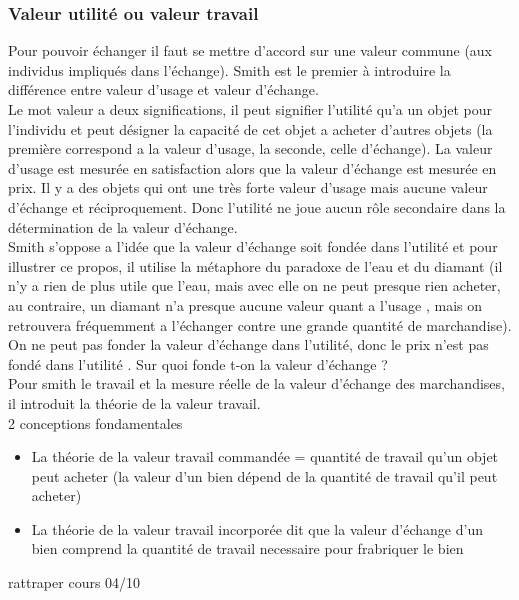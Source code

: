 \documentclass{article}
\begin{document}
\subsubsection{Valeur utilité ou valeur travail}
Pour pouvoir échanger il faut se mettre d'accord sur une valeur commune (aux individus impliqués dans l'échange). Smith est le premier à introduire la différence entre valeur d'usage et valeur d'échange. \\
Le mot valeur a deux significations, il peut signifier l'utilité qu'a un objet pour l'individu et peut désigner la capacité de cet objet a acheter d'autres objets (la première correspond a la valeur d'usage, la seconde, celle d'échange). La valeur d'usage est mesurée en satisfaction alors que la valeur d'échange est mesurée en prix. Il y a des objets qui ont une très forte valeur d'usage mais aucune valeur d'échange et réciproquement. Donc l'utilité ne joue aucun rôle secondaire dans la détermination de la valeur d'échange.\\
Smith s'oppose a l'idée que la valeur d'échange soit fondée dans l'utilité et pour illustrer ce propos, il utilise la métaphore du paradoxe de l'eau et du diamant (il n'y a rien de plus utile que l'eau, mais avec elle on ne peut presque rien acheter, au contraire, un diamant n'a presque aucune valeur quant a l'usage , mais on retrouvera fréquemment a l'échanger contre une grande quantité de marchandise). \\
On ne peut pas fonder la valeur d'échange dans l'utilité, donc le prix n'est pas fondé dans l'utilité . Sur quoi fonde t-on la valeur d'échange ? \\
Pour smith le travail et la mesure réelle de la valeur d'échange des marchandises, il introduit la théorie de la valeur travail.\\
2 conceptions fondamentales
\begin{itemize}
	\item La théorie de la valeur travail commandée = quantité de travail qu'un objet peut acheter (la valeur d'un bien dépend de la quantité de travail qu'il peut acheter)
	\item La théorie de la valeur travail incorporée dit que la valeur d'échange d'un bien comprend la quantité de travail necessaire pour frabriquer le bien
\end{itemize}

rattraper cours 04/10
\end{document}
